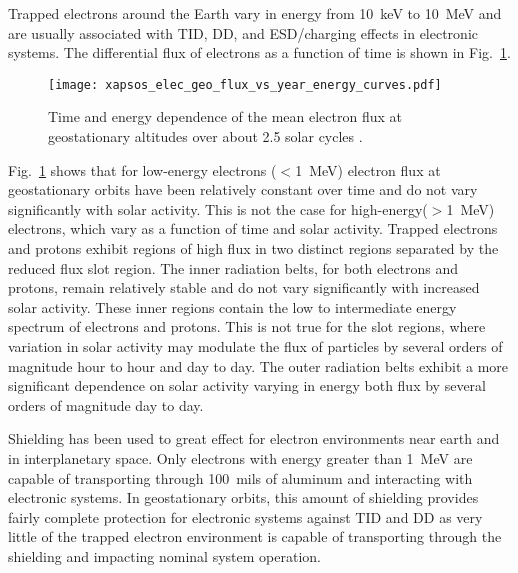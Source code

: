 Trapped electrons around the Earth vary in energy from 10~keV to 10~MeV and are usually associated with TID, DD, and ESD/charging effects in electronic systems.
The differential flux of electrons as a function of time is shown in Fig.~\ref{fig:elec-geo-flux-vs-year}.
\begin{figure}[htbp]
    \begin{center}
        \texttt{[image: xapsos\_elec\_geo\_flux\_vs\_year\_energy\_curves.pdf]}
    \end{center}
    \caption[Time and energy dependence of the mean electron flux at geostationary altitudes over about 2.5 solar cycles.]{Time and energy dependence of the mean electron flux at geostationary altitudes over about 2.5 solar cycles \cite{piet2006model}.}
    \label{fig:elec-geo-flux-vs-year}
\end{figure}
Fig.~\ref{fig:elec-geo-flux-vs-year} shows that for low-energy electrons ($<$1~MeV) electron flux at geostationary orbits have been relatively constant over time and do not vary significantly with solar activity.
This is not the case for high-energy($>$1~MeV) electrons, which vary as a function of time and solar activity.
Trapped electrons and protons exhibit regions of high flux in two distinct regions separated by the reduced flux slot region.
The inner radiation belts, for both electrons and protons, remain relatively stable and do not vary significantly with increased solar activity.
These inner regions contain the low to intermediate energy spectrum of electrons and protons.
This is not true for the slot regions, where variation in solar activity may  modulate the flux of particles by several orders of magnitude hour to hour and day to day.
The outer radiation belts exhibit a more significant dependence on solar activity varying in energy both flux by several orders of magnitude day to day.

Shielding has been used to great effect for electron environments near earth and in interplanetary space.
Only electrons with energy greater than 1~MeV are capable of transporting through 100~mils of aluminum and interacting with electronic systems.
In geostationary orbits, this amount of shielding provides fairly complete protection for electronic systems against TID and DD as very little of the trapped electron environment is capable of transporting through the shielding and impacting nominal system operation.

